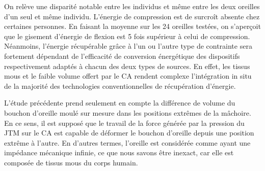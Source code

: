 On relève une disparité notable entre les individus et même entre les deux oreilles d'un seul et même individu. L'énergie de compression est de surcroît absente chez certaines personnes. En faisant la moyenne sur les 24 oreilles testées, on s'aperçoit que le gisement d'énergie de flexion est 5 fois supérieur à celui de compression. Néanmoins, l'énergie récupérable grâce à l'un ou l'autre type de contrainte sera fortement dépendant de l'efficacité de conversion énergétique des dispositifs respectivement adaptés à chacun des deux types de sources. En effet, les tissus mous et le faible volume offert par le CA rendent complexe l'intégration in situ de la majorité des technologies conventionnelles de récupération d'énergie.

L'étude précédente prend seulement en compte la différence de volume du bouchon d'oreille moulé sur mesure dans les positions extrêmes de la mâchoire. En ce sens, il est supposé que le travail de la force générée par la pression du JTM sur le CA est capable de déformer le bouchon d'oreille depuis une position extrême à l'autre. En d'autres termes, l'oreille est considérée comme ayant une impédance mécanique infinie, ce que nous savons être inexact, car elle est composée de tissus mous du corps humain.
